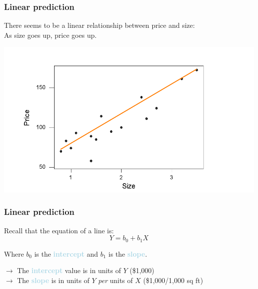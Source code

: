 \documentclass{beamer}
\newcommand{\lb}[1]{\textcolor{lightblue}{#1}}
\newcommand{\rd}{\color{burntorange}}
\newcommand{\bk}{\color{black}}
\newcommand{\sk}{\vspace{.5cm}}
\begin{document}
\begin{frame}
\frametitle{Linear prediction}

\vspace{3mm}
There seems to be a linear relationship between 
price and size:\\ \vspace{3mm}
\centering \rd As size goes up, price goes up. \bk

\vspace{-6mm}
\begin{center}\includegraphics[scale=0.68]{figures/eyeball.pdf}\end{center}


\end{frame}

\begin{frame}
\frametitle{Linear prediction} \vspace{-0.5cm}

Recall that the equation of a line is: \vspace{3mm}
\[
				Y = b_0 + b_1 X
\]

\vspace{3mm}
Where  $b_0$ is the \lb{ \bf intercept} \bk and $b_1$ is the \lb{ \bf slope}\bk.

\sk
\sk
$\rightarrow$ The \lb{\bf intercept} value is in  units of $Y$ (\$1,000)\\ \sk
$\rightarrow$ The \lb{\bf slope} is in units of $Y$ {\it per} units of $X$ (\$1,000/1,000 sq ft)

\end{frame}

\end{document}
